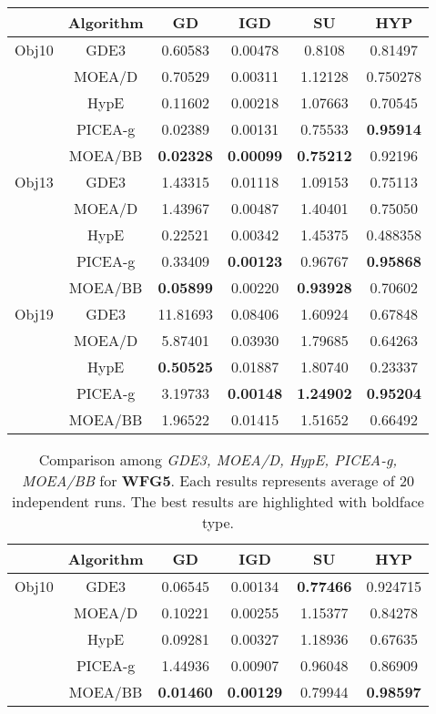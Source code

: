\begin{center}
\begin{table}[!h]
\begin{tabular}{| c | c | c | c | c | c |}
\hline
&\textbf{Algorithm}	&\textbf{GD}&\textbf{IGD}&\textbf{SU}&\textbf{HYP}\\\hline
Obj10	&GDE3		&0.60583			&0.00478			&0.8108				&0.81497\\\cline{2-6}
		&MOEA/D		&0.70529			&0.00311			&1.12128			&0.750278\\\cline{2-6}
		&HypE		&0.11602			&0.00218			&1.07663			&0.70545\\\cline{2-6}
		&PICEA-g	&0.02389			&0.00131			&0.75533			&\textbf{0.95914}\\\cline{2-6}
		&MOEA/BB	&\textbf{0.02328}	&\textbf{0.00099}	&\textbf{0.75212}	&0.92196\\\hline
		
Obj13	&GDE3		&1.43315			&0.01118			&1.09153			&0.75113\\\cline{2-6}
		&MOEA/D		&1.43967			&0.00487			&1.40401			&0.75050\\\cline{2-6}
		&HypE		&0.22521			&0.00342			&1.45375			&0.488358\\\cline{2-6}
		&PICEA-g	&0.33409			&\textbf{0.00123}	&0.96767			&\textbf{0.95868}\\\cline{2-6}
		&MOEA/BB	&\textbf{0.05899}	&0.00220			&\textbf{0.93928}	&0.70602\\\hline					
		
Obj19	&GDE3		&11.81693			&0.08406			&1.60924			&0.67848\\\cline{2-6}
		&MOEA/D		&5.87401			&0.03930			&1.79685			&0.64263\\\cline{2-6}
		&HypE		&\textbf{0.50525}	&0.01887			&1.80740			&0.23337\\\cline{2-6}
		&PICEA-g	&3.19733			&\textbf{0.00148}	&\textbf{1.24902}	&\textbf{0.95204}\\\cline{2-6}
		&MOEA/BB	&1.96522			&0.01415			&1.51652			&0.66492\\
\hline
\end{tabular}

\label{tab:wfg4}

\end{table}
\begin{table}[!h]
\caption{Comparison among \textit{GDE3, MOEA/D, HypE, PICEA-g, MOEA/BB} for \textbf{WFG5}. Each results represents average of 20 independent runs. The best results are highlighted with boldface type.}
\begin{tabular}{| c | c | c | c | c | c |}

\hline
&\textbf{Algorithm}	&\textbf{GD}&\textbf{IGD}&\textbf{SU}&\textbf{HYP}\\\hline
Obj10	&GDE3		&0.06545			&0.00134			&\textbf{0.77466}	&0.924715\\\cline{2-6}
		&MOEA/D		&0.10221			&0.00255			&1.15377			&0.84278\\\cline{2-6}
		&HypE		&0.09281			&0.00327			&1.18936			&0.67635\\\cline{2-6}
		&PICEA-g	&1.44936			&0.00907			&0.96048			&0.86909\\\cline{2-6}
		&MOEA/BB	&\textbf{0.01460}	&\textbf{0.00129}	&0.79944			&\textbf{0.98597}\\\hline
		

\end{tabular}
\end{table}
\end{center}
